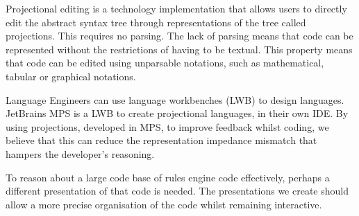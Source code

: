 Projectional editing is a technology implementation that allows users to directly edit the abstract syntax tree through representations of the tree called projections.
This requires no parsing. 
The lack of parsing means that code can be represented without the restrictions of having to be textual.
This property means that code can be edited using unparsable notations, such as mathematical, tabular or graphical notations. 

Language Engineers can use language workbenches (LWB) to design languages.
JetBrains MPS is a LWB to create projectional languages, in their own IDE.
By using projections, developed in MPS, to improve feedback whilst coding, we believe that this can reduce the representation impedance mismatch that hampers the developer's reasoning.

To reason about a large code base of rules engine code effectively, perhaps a different presentation of that code is needed.
The presentations we create should allow a more precise organisation of the code whilst remaining interactive.



